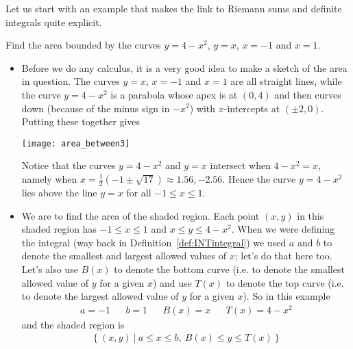 Let us start with an example that makes the link to Riemann sums and definite integrals
quite explicit.
\begin{eg}\label{eg areabetween riemann}
 Find the area bounded by the curves $y=4-x^2$, $y=x$, $x=-1$ and $x=1$.

\soln
\begin{itemize}
 \item Before we do any calculus, it is a very good idea to make a sketch of the area in
question. The curves $y=x$, $x=-1$ and $x=1$ are all straight lines, while the curve
$y=4-x^2$ is a parabola whose apex is at $(0,4)$ and then curves down  (because of the
minus sign in $-x^2$) with $x$-intercepts at $(\pm2,0)$. Putting these together gives
\begin{efig}
 \centering
\texttt{[image: area\_between3]}
\end{efig}
Notice that the curves $y=4-x^2$ and $y=x$ intersect when $4-x^2=x$, namely when $x=
\frac{1}{2}\left(-1\pm\sqrt{17}\right) \approx 1.56,-2.56$. Hence the curve $y=4-x^2$
lies above the line $y=x$ for all $-1\le x\le 1$.

\item We are to find the area of the shaded region. Each point $(x,y)$ in this
shaded region has $-1\le x\le 1$ and $x \le y \le 4-x^2$. When we were
defining the integral (way back in Definition~\ref{def:INTintegral}) we used $a$ and $b$
to denote the smallest and largest allowed values of $x$; let's do that here too.
Let's also use $B(x)$ to denote the bottom curve (i.e. to denote the smallest allowed
value of $y$ for a given $x$) and use $T(x)$ to denote the top curve (i.e. to denote the
largest allowed value of $y$ for a given $x$). So in this example
\begin{align*}
a=-1&& b=1&& B(x)=x&& T(x)=4-x^2
\end{align*}
and the shaded region is
\begin{align*}
\big\{\ (x,y)\ \big|\ a\le x\le b,\ B(x)\le y\le T(x)\ \big\}
\end{align*}


\end{itemize}
\end{eg}
